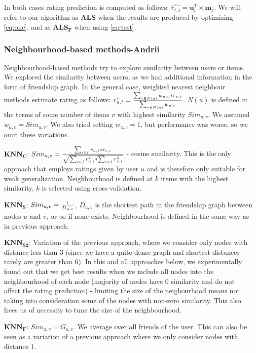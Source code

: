\documentclass{article} %
\begin{document}
In both cases rating prediction is computed as follows: $\hat{r_{i,j}} =
\mathbf{u}_{i}^T \times \mathbf{m}_{j}$. We will refer to our algorithm as
$\bm{ALS}$ when the results are produced by optimizing \eqref{eq:one}, and as
$\bm{ALS_F}$ when using \eqref{eq:test}.

\subsubsection{Neighbourhood-based methods-Andrii}

Neighbourhood-based methods try to explore similarity between users or items. We
explored the similarity between users, as we had additional information in the
form of friendship graph. In the general case, weighted nearest neighbour
methods estimate rating as follows:
$\hat{r_{u,i}} = {{\sum_{v \in N(u)}w_{u,v} * r_{v,i}}\over \sum_{v \in
N(u)}w_{u,v}}$. $N(u)$ is defined in the terms of some number of items $v$ with
highest similarity $Sim_{u,v}$. We assumed $w_{u,v} = Sim_{u,v}$. We also tried
setting $w_{u,v} = 1$, but performance was worse, so we omit these variations.

$\bm{KNN_C}$: $Sim_{u,v} = {\sum_{i \in I}r_{u,i} * r_{v,i} \over \sqrt{\sum_{i
\in I}{r_{u,i}^2} * \sum_{i \in I}{r_{v,i}^2}}}$ - cosine similarity. This is the
  only approach that employs ratings given by user $u$ and is therefore only
  suitable for weak generalization. Neighbourhood is defined at $k$ items
  with the highest similarity, $k$ is selected using cross-validation.
  
$\bm{KNN_S}$: $Sim_{u,v} = {1 \over D_{u,v}}$, $D_{u,v}$ is the shortest path in
the friendship graph between nodes $u$ and $v$, or $\infty$ if none exists.
Neighbourhood is defined in the same way as in previous approach.

$\bm{KNN_{S2}}$: Variation of the previous approach, where we consider only
nodes with distance less than 3 (since we have a quite dense graph and shortest distances
rarely are greater than 6). In this and all approaches below, we experimentally
found out that we get best results when we include all nodes into the
neighbourhood of each node (majority of nodes have 0 similarity and do not
affect the rating prediction) - limiting the size of the neighourhood means not
taking into consideration some of the nodes with non-zero similarity. This also
frees us of necessity to tune the size of the neighbourhood.

$\bm{KNN_F}$: $Sim_{u,v} = G_{u,v}$. We average over all friends of the user.
This can also be seen as a variation of a previous approach where we only consider
nodes with distance 1.
\end{document}
